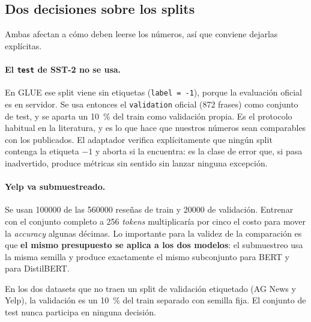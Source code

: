 \subsection{Dos decisiones sobre los splits}

Ambas afectan a cómo deben leerse los números, así que conviene dejarlas
explícitas.

\paragraph{El \texttt{test} de SST-2 no se usa.} En GLUE ese split viene sin
etiquetas (\texttt{label = -1}), porque la evaluación oficial es en servidor.
Se usa entonces el \texttt{validation} oficial (\num{872} frases) como
conjunto de test, y se aparta un \SI{10}{\percent} del train como validación
propia. Es el protocolo habitual en la literatura, y es lo que hace que
nuestros números sean comparables con los publicados. El adaptador verifica
explícitamente que ningún split contenga la etiqueta $-1$ y aborta si la
encuentra: es la clase de error que, si pasa inadvertido, produce métricas sin
sentido sin lanzar ninguna excepción.

\paragraph{Yelp va submuestreado.} Se usan \num{100000} de las \num{560000}
reseñas de train y \num{20000} de validación. Entrenar con el conjunto
completo a 256 \textit{tokens} multiplicaría por cinco el costo para mover la
\textit{accuracy} algunas décimas. Lo importante para la validez de la
comparación es que \textbf{el mismo presupuesto se aplica a los dos modelos}:
el submuestreo usa la misma semilla y produce exactamente el mismo
subconjunto para BERT y para DistilBERT.

En los dos datasets que no traen un split de validación etiquetado (AG News y
Yelp), la validación es un \SI{10}{\percent} del train separado con semilla
fija. El conjunto de test nunca participa en ninguna decisión.
